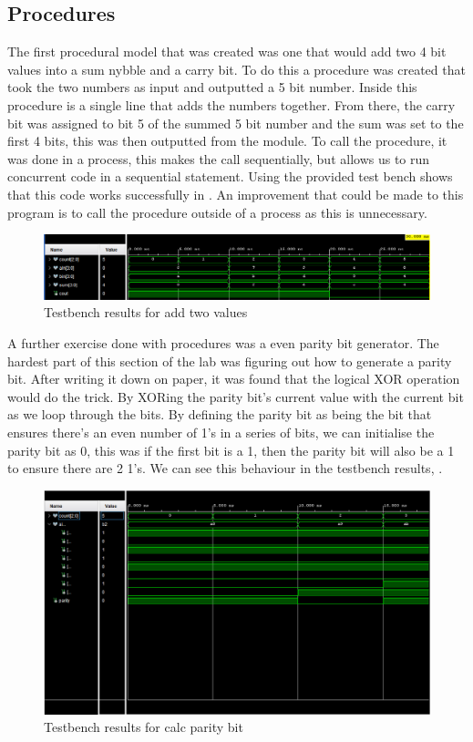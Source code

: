 \documentclass[a4paper, 12pt]{article}
\begin{document}
		\subsection{Procedures}
			The first procedural model that was created was one that would add two 4 bit values into a sum nybble and a carry bit. To do this a procedure was created that took the two numbers as input and outputted a 5 bit number. Inside this procedure is a single line that adds the numbers together. From there, the carry bit was assigned to bit 5 of the summed 5 bit number and the sum was set to the first 4 bits, this was then outputted from the module. To call the procedure, it was done in a process, this makes the call sequentially, but allows us to run concurrent code in a sequential statement. Using the provided test bench shows that this code works successfully in . An improvement that could be made to this program is to call the procedure outside of a process as this is unnecessary.
			\begin{figure}[!ht]
				\centering
				\includegraphics[width=0.9\columnwidth]{lab311.PNG}
				\caption{Testbench results for add two values}
				\label{fig:311}
			\end{figure}
			\par
			A further exercise done with procedures was a even parity bit generator. The hardest part of this section of the lab was figuring out how to generate a parity bit. After writing it down on paper, it was found that the logical XOR operation would do the trick. By XORing the parity bit's current value with the current bit as we loop through the bits. By defining the parity bit as being the bit that ensures there's an even number of 1's in a series of bits, we can initialise the parity bit as 0, this was if the first bit is a 1, then the parity bit will also be a 1 to ensure there are 2 1's. We can see this behaviour in the testbench results, .

			\begin{figure}[!ht]
				\centering
				\includegraphics[width=0.9\columnwidth]{lab312.PNG}
				\caption{Testbench results for calc parity bit}
				\label{fig:312}
			\end{figure}
			\par
\end{document}

